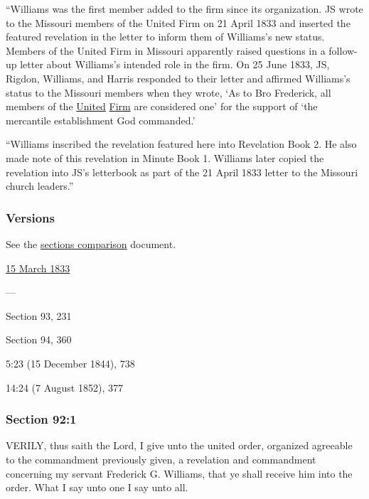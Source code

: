 			``Williams was the first member added to the firm since its organization. JS wrote to the Missouri members of the United Firm on 21 April 1833 and inserted the featured revelation in the letter to inform them of Williams's new status. Members of the United Firm in Missouri apparently raised questions in a follow-up letter about Williams's intended role in the firm. On 25 June 1833, JS, Rigdon, Williams, and Harris responded to their letter and affirmed Williams's status to the Missouri members when they wrote, `As to Bro Frederick, all members of the \uline{United} \uline{Firm} are considered one' for the support of `the mercantile establishment God commanded.'
			
			``Williams inscribed the revelation featured here into Revelation Book 2. He also made note of this revelation in Minute Book 1. Williams later copied the revelation into JS's letterbook as part of the 21 April 1833 letter to the Missouri church leaders.''
			
	\subsubsection{Versions}
		\label{DC92-V}
		
		See the \href{https://drive.google.com/file/d/1goAvNz8jS4R8slYfMG_db55Ty2z_vmgK/view?usp=sharing}{sections comparison} document.
	
		\begin{compactdesc}
			\item[JSP] \hyperref[EMS-1833-JS-15-MAR-1833]{15 March 1833}
			\item[BC] ---
			\item[DC 1835] Section 93, 231
			\item[DC 1844] Section 94, 360
			\item[TS] 5:23 (15 December 1844), 738
			\item[MS] 14:24 (7 August 1852), 377
		\end{compactdesc}

	\subsubsection{Section 92:1} %
		\label{DC92-1}

		VERILY, thus saith the Lord, I give unto the united order, organized agreeable to the commandment previously given, a revelation and commandment concerning my servant Frederick G. Williams, that ye shall receive him into the order.  What I say unto one I say unto all.

